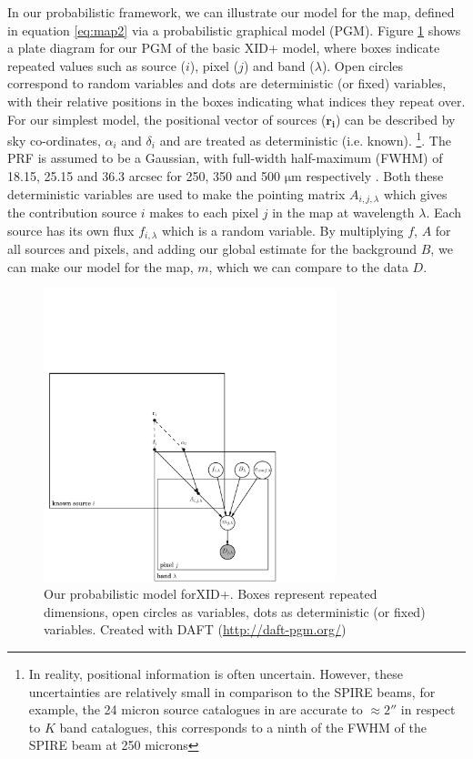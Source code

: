 \documentclass[useAMS,usenatbib]{mnras}
\begin{document}
In our probabilistic framework, we can illustrate our model for the map, defined in equation \ref{eq:map2} via a probabilistic graphical model (PGM). Figure \ref{fig:graph_mod_xid+} shows a plate diagram \citep{Bishop:2006} for our PGM of the basic XID+ model, where boxes  indicate repeated values such as source ($i$), pixel ($j$) and band ($\lambda$). Open circles correspond to random variables and dots are deterministic (or fixed) variables, with their relative positions in the boxes indicating what indices they repeat over. For our simplest model, the positional vector of sources ($\mathbf{r_i}$) can be described by sky co-ordinates, $\alpha_i$ and $\delta_i$ and are treated as deterministic (i.e. known). \footnote{In reality, positional information is often uncertain. However, these uncertainties are relatively small in comparison to the SPIRE beams, for example, the 24 micron source catalogues in \citep{LeFLoch:2009} are accurate to $\approx 2''$ in respect to $K$ band catalogues, this corresponds to a ninth of the FWHM of the SPIRE beam at 250 microns}. The PRF is assumed to be a Gaussian, with full-width half-maximum (FWHM) of 18.15, 25.15 and 36.3 arcsec for 250, 350 and 500 $\mathrm{\mu m}$ respectively \citep{Griffin:2010}. Both these deterministic variables are used to make the pointing matrix $A_{i,j,\lambda}$ which gives the contribution source $i$ makes to each pixel $j$ in the map at wavelength $\lambda$. Each source has its own flux $f_{i,\lambda}$ which is a random variable. By multiplying $f$, $A$ for all sources and pixels, and adding our global estimate for the background $B$, we can make our model for the map, $m$, which we can compare to the data $D$. 
\begin{figure}
\includegraphics[width=8.5cm]{./graphical_model.pdf}
\caption{Our probabilistic model for\textsc{XID+}. Boxes represent repeated dimensions, open circles as variables, dots as deterministic (or fixed) variables. Created with DAFT (\url{http://daft-pgm.org/})}\label{fig:graph_mod_xid+}
\end{figure}
 
\end{document}
